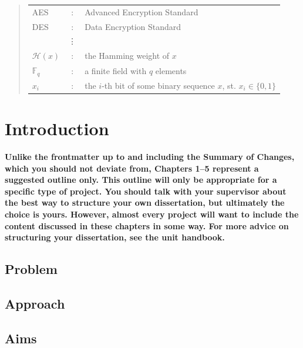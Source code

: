 \documentclass[oneside,%
                    author={Malak Hajji},
                    degree={BSc},
                    title={Designing An Accessible Computational Toolkit For Students},
                  subtitle={With Mixed Visual Abilities}]{dissertation}
\begin{document}
\begin{quote}
\noindent
\begin{tabular}{lcl}
AES                 &:     & Advanced Encryption Standard                                         \\
DES                 &:     & Data Encryption Standard                                             \\
                    &\vdots&                                                                      \\
${\mathcal H}( x )$ &:     & the Hamming weight of $x$                                            \\
${\mathbb  F}_q$    &:     & a finite field with $q$ elements                                     \\
$x_i$               &:     & the $i$-th bit of some binary sequence $x$, st. $x_i \in \{ 0, 1 \}$ \\
\end{tabular}
\end{quote}


\mainmatter
\chapter{Introduction}
\label{chap:context}

{\bf Unlike the frontmatter up to and including the Summary of Changes, which you should not deviate from, Chapters 1--5 represent a suggested outline only. This outline will only be appropriate for a specific type of project. You should talk with your supervisor about the best way to structure your own dissertation, but ultimately the choice is yours. However, almost every project will want to include the content discussed in these chapters in some way. For more advice on structuring your dissertation, see the unit handbook.}
\vspace{1cm} 
\section{Problem}
\section{Approach}
\section{Aims}
\end{document}
